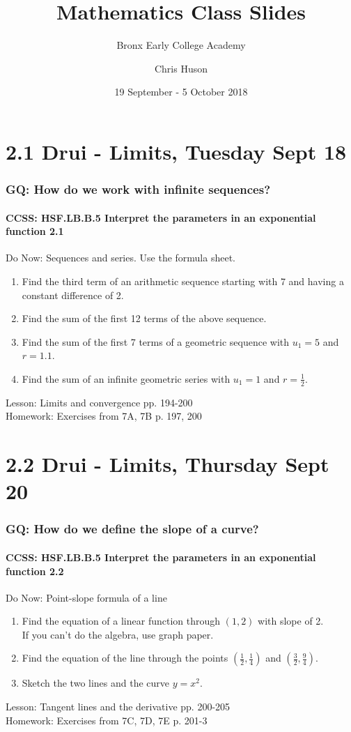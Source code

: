 \documentclass{beamer}
\title{Mathematics Class Slides}
\subtitle{Bronx Early College Academy}
\author{Chris Huson}
\date{19 September - 5 October 2018}
\begin{document}
\frame{\titlepage}

\section[Outline]{}
\frame{\tableofcontents}

\section{2.1 Drui - Limits, Tuesday Sept 18}
  \frame
  {
    \frametitle{GQ: How do we work with infinite sequences?}
    \framesubtitle{CCSS: HSF.LB.B.5 Interpret the parameters in an exponential function  \alert{2.1}}

    \begin{block}{Do Now: Sequences and series. Use the formula sheet.}
      \begin{enumerate}
      \item Find the third term of an arithmetic sequence starting with 7 and having a constant difference of 2.
      \item Find the sum of the first 12 terms of the above sequence.
      \item Find the sum of the first 7 terms of a geometric sequence with $u_1=5$ and $r=1.1$.
      \item Find the sum of an infinite geometric series with $u_1=1$ and $r=\frac{1}{2}$.
      \end{enumerate}
   \end{block}
    Lesson: Limits and convergence pp. 194-200\\ \bigskip
    Homework: Exercises from 7A, 7B p. 197, 200
  }

  \section{2.2 Drui - Limits, Thursday Sept 20}
    \frame
    {
      \frametitle{GQ: How do we define the slope of a curve?}
      \framesubtitle{CCSS: HSF.LB.B.5 Interpret the parameters in an exponential function  \alert{2.2}}

      \begin{block}{Do Now: Point-slope formula of a line}
        \begin{enumerate}
        \item Find the equation of a linear function through $(1,2)$ with slope of 2.\\
        If you can't do the algebra, use graph paper.
        \item Find the equation of the line through the points $\displaystyle (\frac{1}{2}, \frac{1}{4})$ and $\displaystyle (\frac{3}{2}, \frac{9}{4})$.
        \item Sketch the two lines and the curve $y=x^2$.
        \end{enumerate}
     \end{block}
      Lesson: Tangent lines and the derivative pp. 200-205\\ \bigskip
      Homework: Exercises from 7C, 7D, 7E p. 201-3
    }
\end{document}
